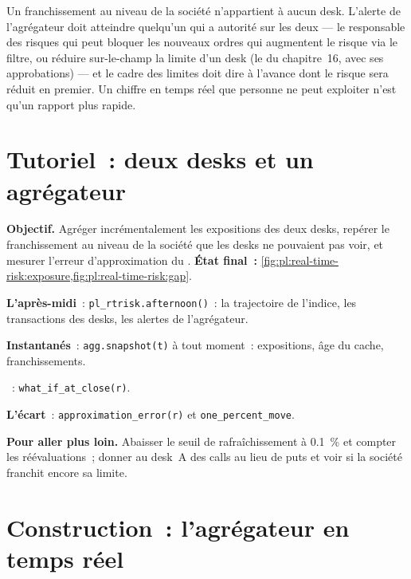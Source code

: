 \begin{remark}\label{rem:pl:real-time-risk:who}
Un franchissement au niveau de la société n'appartient à aucun desk. L'alerte de l'agrégateur doit atteindre quelqu'un qui a autorité sur les deux --- le responsable des risques qui peut
bloquer les nouveaux ordres qui augmentent le risque via le filtre, ou réduire sur-le-champ la limite d'un desk (le  du chapitre~16, avec ses approbations) ---
et le cadre des limites doit dire à l'avance dont le risque sera réduit en premier. Un chiffre en temps réel que personne ne peut exploiter n'est qu'un rapport plus rapide.
\end{remark}

\section{Tutoriel~: deux desks et un agrégateur}\label{tut:pl:real-time-risk:tut}

\begin{tutorial}
\textbf{Objectif.} Agréger incrémentalement les expositions des deux desks, repérer le franchissement au niveau de la société que les desks ne pouvaient pas voir, et mesurer l'erreur d'approximation du
. \textbf{État final~:} \cref{fig:pl:real-time-risk:exposure,fig:pl:real-time-risk:gap}.
\begin{tutsteps}
\item \textbf{L'après-midi}~: \texttt{pl\_rtrisk.afternoon()}~: la trajectoire de l'indice, les transactions des desks, les alertes de l'agrégateur.
\item \textbf{Instantanés}~: \texttt{agg.snapshot(t)} à tout moment~: expositions, âge du cache, franchissements.
\item \textbf{}~: \texttt{what\_if\_at\_close(r)}.
\item \textbf{L'écart}~: \texttt{approximation\_error(r)} et \texttt{one\_percent\_move}.
\end{tutsteps}
\textbf{Pour aller plus loin.} Abaisser le seuil de rafraîchissement à 0.1~\% et compter les réévaluations~; donner au desk~A des calls au lieu de puts et voir si
la société franchit encore sa limite.
\end{tutorial}

\section{Construction~: l'agrégateur en temps réel}\label{bld:pl:real-time-risk:rtrisk}

